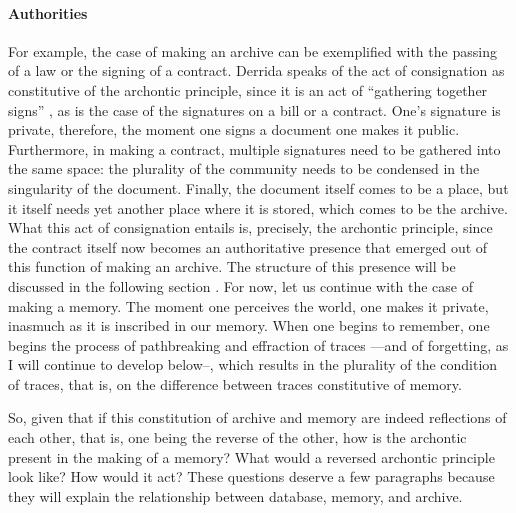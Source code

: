 {	\paragraph{Authorities}
	For example, the case of making an archive can be exemplified with the passing of a law or the signing of a contract. Derrida speaks of the act of consignation as constitutive of the archontic principle, since it is an act of ``gathering together signs'' \parencite[10]{Der95:Arc}, as is the case of the signatures on a bill or a contract. One's signature is private, therefore, the moment one signs a document one makes it public. Furthermore, in making a contract, multiple signatures need to be gathered into the same space: the plurality of the community needs to be condensed in the singularity of the document. Finally, the document itself comes to be a place, but it itself needs yet another place where it is stored, which comes to be the archive. What this act of consignation entails is, precisely, the archontic principle, since the contract itself now becomes an authoritative presence that emerged out of this function of making an archive. The structure of this presence will be discussed in the following section . For now, let us continue with the case of making a memory. The moment one perceives the world, one makes it private, inasmuch as it is inscribed in our memory. When one begins to remember, one begins the process of pathbreaking and effraction of traces ---and of forgetting, as I will continue to develop below--, which results in the plurality of the condition of traces, that is, on the difference between traces constitutive of memory.

	So, given that if this constitution of archive and memory are indeed reflections of each other, that is, one being the reverse of the other, how is the archontic present in the making of a memory? What would a reversed archontic principle look like? How would it act? These questions deserve a few paragraphs because they will explain the relationship between database, memory, and archive. 

}
